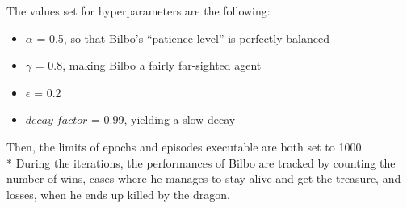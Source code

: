 The values set for hyperparameters are the following:
\begin{itemize}[noitemsep, topsep=0ex]
  \item $\alpha$ = 0.5, so that Bilbo's ``patience level'' is perfectly balanced
  \item $\gamma$ = 0.8, making Bilbo a fairly far-sighted agent 
  \item $\epsilon$ = 0.2
  \item $decay\;factor$ = 0.99, yielding a slow decay
\end{itemize} 
Then, the limits of epochs and episodes executable are both set to 1000.\\*
During the iterations, the performances of Bilbo are tracked by counting the number of wins, cases where he manages to stay alive and get the treasure, and losses, when he ends up killed by the dragon.


